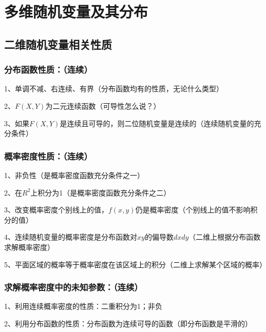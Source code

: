 \chapter{多维随机变量及其分布}

\section{二维随机变量相关性质}



\subsection{分布函数性质：（连续）}

1、单调不减、右连续、有界（分布函数均有的性质，无论什么类型）

2、$F(X,Y)$为二元连续函数（可导性怎么说？）

3、如果$F(X,Y)$是连续且可导的，则二位随机变量是连续的（连续随机变量的充分条件）



\subsection{概率密度性质：（连续）}

1、非负性（是概率密度函数充分条件之一）

2、在$R^2$上积分为1（是概率密度函数充分条件之二）

3、改变概率密度个别线上的值，$f(x,y)$仍是概率密度（个别线上的值不影响积分的值）

4、连续随机变量的概率密度是分布函数对$xy$的偏导数$dxdy$（二维上根据分布函数求解概率密度）

5、平面区域的概率等于概率密度在该区域上的积分（二维上求解某个区域的概率）



\subsection{求解概率密度中的未知参数：（连续）}

1、利用连续概率密度的性质：二重积分为1；非负

2、利用分布函数的性质：分布函数为连续可导的函数（即分布函数是平滑的）



